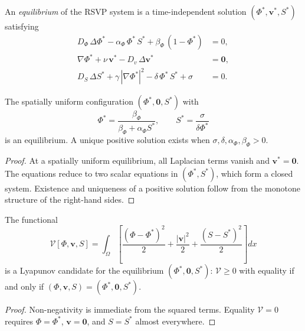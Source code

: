 \documentclass[11pt,openany]{book}
\begin{document}
\begin{definition}
An \emph{equilibrium} of the RSVP system is a time-independent
solution $(\Phi^*, \boldsymbol{v}^*, S^*)$ satisfying
\begin{align*}
  D_\Phi\,\Delta\Phi^* - \alpha_\Phi\,\Phi^*\,S^*
    + \beta_\Phi\,(1-\Phi^*) &= 0, \\
  \nabla\Phi^* + \nu\,\boldsymbol{v}^*
    - D_v\,\Delta\boldsymbol{v}^* &= \mathbf{0}, \\
  D_S\,\Delta S^* + \gamma\,|\nabla\Phi^*|^2
    - \delta\,\Phi^*\,S^* + \sigma &= 0.
\end{align*}
\end{definition}

\begin{proposition}
\label{prop:uniform-equilibrium}
The spatially uniform configuration $(\Phi^*, \mathbf{0},
S^*)$ with
\[
  \Phi^* = \frac{\beta_\Phi}{\beta_\Phi +
    \alpha_\Phi S^*}, \qquad
  S^* = \frac{\sigma}{\delta\Phi^*}
\]
is an equilibrium.  A unique positive solution exists when
$\sigma, \delta, \alpha_\Phi, \beta_\Phi > 0$.
\end{proposition}

\begin{proof}
At a spatially uniform equilibrium, all Laplacian terms
vanish and $\boldsymbol{v}^* = \mathbf{0}$.  The
equations reduce to two scalar equations in $(\Phi^*, S^*)$,
which form a closed system.  Existence and uniqueness of a
positive solution follow from the monotone structure of the
right-hand sides.
\end{proof}

\begin{proposition}
\label{prop:rsvp-lyapunov}
The functional
\[
  \mathcal{V}[\Phi, \boldsymbol{v}, S] = \int_\Omega
  \left[
    \frac{(\Phi - \Phi^*)^2}{2}
    + \frac{|\boldsymbol{v}|^2}{2}
    + \frac{(S - S^*)^2}{2}
  \right] dx
\]
is a Lyapunov candidate for the equilibrium
$(\Phi^*, \mathbf{0}, S^*)$: $\mathcal{V} \ge 0$ with
equality if and only if $(\Phi, \boldsymbol{v}, S) =
(\Phi^*, \mathbf{0}, S^*)$.
\end{proposition}

\begin{proof}
Non-negativity is immediate from the squared terms.
Equality $\mathcal{V} = 0$ requires $\Phi = \Phi^*$,
$\boldsymbol{v} = \mathbf{0}$, and $S = S^*$ almost
everywhere.
\end{proof}
\end{document}
